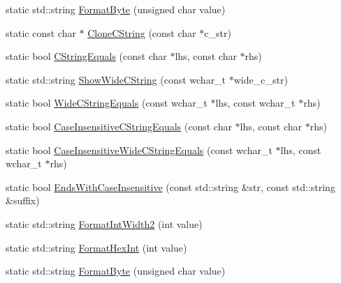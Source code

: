 \begin{DoxyCompactItemize}
\item 
static std\-::string \hyperlink{classtesting_1_1internal_1_1_string_af702dc7cbd569589d8e3ff215a7cafa9}{Format\-Byte} (unsigned char value)
\item 
static const char $\ast$ \hyperlink{classtesting_1_1internal_1_1_string_a8bce6b1281ae3d2f9061b920aa78aca0}{Clone\-C\-String} (const char $\ast$c\-\_\-str)
\item 
static bool \hyperlink{classtesting_1_1internal_1_1_string_a06919f642bd47f0593196b460d352f24}{C\-String\-Equals} (const char $\ast$lhs, const char $\ast$rhs)
\item 
static std\-::string \hyperlink{classtesting_1_1internal_1_1_string_acbf0511e9ae5009f42de77e565f6ba61}{Show\-Wide\-C\-String} (const wchar\-\_\-t $\ast$wide\-\_\-c\-\_\-str)
\item 
static bool \hyperlink{classtesting_1_1internal_1_1_string_a4f5e053907ebced07fe0dc52dd2d1e85}{Wide\-C\-String\-Equals} (const wchar\-\_\-t $\ast$lhs, const wchar\-\_\-t $\ast$rhs)
\item 
static bool \hyperlink{classtesting_1_1internal_1_1_string_a7ce24c41c67b928fe89434d3571c988c}{Case\-Insensitive\-C\-String\-Equals} (const char $\ast$lhs, const char $\ast$rhs)
\item 
static bool \hyperlink{classtesting_1_1internal_1_1_string_a0a67eac434fa7800640c9d56cb91e105}{Case\-Insensitive\-Wide\-C\-String\-Equals} (const wchar\-\_\-t $\ast$lhs, const wchar\-\_\-t $\ast$rhs)
\item 
static bool \hyperlink{classtesting_1_1internal_1_1_string_a3de1df085eddc89ef3f3833c67aee3fe}{Ends\-With\-Case\-Insensitive} (const std\-::string \&str, const std\-::string \&suffix)
\item 
static std\-::string \hyperlink{classtesting_1_1internal_1_1_string_a51cab855f7ec6091e5886b6be5598ca2}{Format\-Int\-Width2} (int value)
\item 
static std\-::string \hyperlink{classtesting_1_1internal_1_1_string_a7bedf4780e0c938d203b73ddb17ff490}{Format\-Hex\-Int} (int value)
\item 
static std\-::string \hyperlink{classtesting_1_1internal_1_1_string_ab3555eeb6abe4b7c6f63d865af10379d}{Format\-Byte} (unsigned char value)
\end{DoxyCompactItemize}


